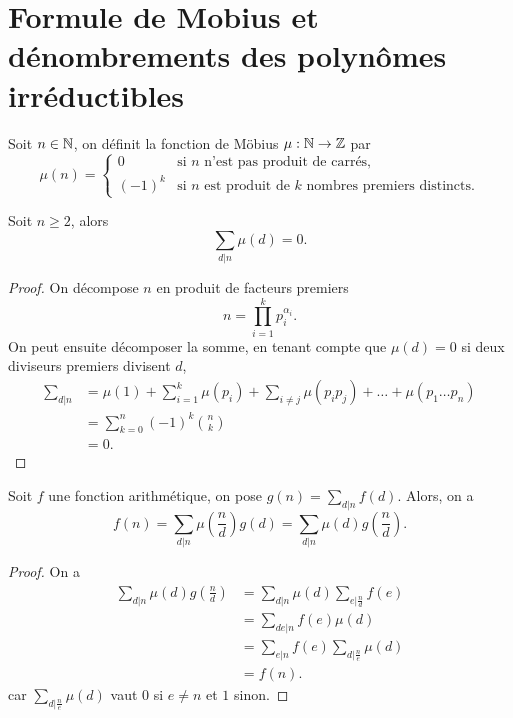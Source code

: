 \documentclass[../main.tex]{subfiles}
\begin{document}
\section{Formule de Mobius et dénombrements des polynômes irréductibles}
\begin{definition} Soit \(n\in\mathbb{N}\), on définit la fonction de Möbius \(\mu:\mathbb{N}\to\mathbb{Z}\) par
    \begin{equation}
        \mu(n) = \begin{cases}
            0 & \text{si } n \text{ n'est pas produit de carrés,}\\
            (-1)^k & \text{si } n \text{ est produit de } k \text{ nombres premiers distincts.}
        \end{cases}
    \end{equation}
\end{definition}
\begin{proposition} Soit \(n\ge 2\), alors
    \begin{equation}
        \sum_{d|n} \mu(d) = 0.
    \end{equation}
\end{proposition}
\begin{proof} On décompose \(n\) en produit de facteurs premiers 
    \begin{equation}
        n = \prod_{i=1}^k p_i^{\alpha_i}.
    \end{equation}
    On peut ensuite décomposer la somme, en tenant compte que \(\mu(d) = 0\) si deux diviseurs premiers divisent \(d\),
    \begin{align}
        \sum_{d|n} &= \mu(1) + \sum_{i=1}^k \mu(p_i) + \sum_{i\neq j} \mu(p_ip_j) + \ldots + \mu(p_1\ldots p_n)\\
        &= \sum_{k=0}^n (-1)^k \binom{n}{k}\\ 
        &= 0.
    \end{align}
\end{proof}
\begin{theorem} Soit \(f\) une fonction arithmétique, on pose 
    \(g(n) = \sum_{d|n} f(d)\). Alors, on a
    \begin{equation}
        f(n) = \sum_{d|n}\mu\left(\frac{n}{d}\right) g(d) = \sum_{d|n}\mu(d)g\left(\frac{n}{d}\right).
    \end{equation}
\end{theorem}
\begin{proof} On a
    \begin{align}
        \sum_{d|n}\mu(d)g\left(\frac{n}{d}\right) & = \sum_{d|n}\mu(d)\sum_{e|\frac{n}{d}}f(e)\\
        & = \sum_{de|n}f(e)\mu(d)\\
        & = \sum_{e|n}f(e)\sum_{d|\frac{n}{e}}\mu(d)\\
        & = f(n).
    \end{align}
    car \(\sum_{d|\frac{n}{e}}\mu(d)\) vaut \(0\) si \(e\neq n\) et \(1\) sinon.
\end{proof}
\end{document}
